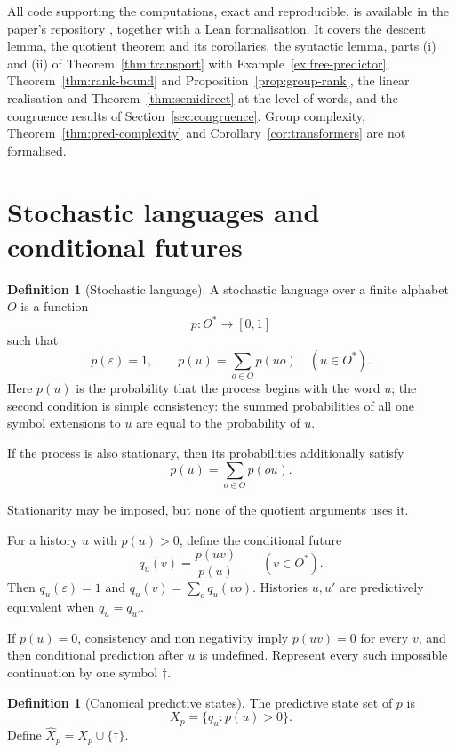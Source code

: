 \documentclass[10pt]{article}
\theoremstyle{definition}
\newtheorem{definition}[theorem]{Definition}
\theoremstyle{remark}
\newcommand{\Obs}{O}
\newcommand{\eps}{\varepsilon}
\begin{document}
All code supporting the computations, exact and reproducible, is
available in the paper's repository \cite{DovetailRepo}, together
with a Lean formalisation.  It covers the descent lemma, the quotient
theorem and its corollaries, the syntactic lemma, parts (i) and (ii)
of Theorem~\ref{thm:transport} with
Example~\ref{ex:free-predictor}, Theorem~\ref{thm:rank-bound} and
Proposition~\ref{prop:group-rank}, the linear realisation and
Theorem~\ref{thm:semidirect} at the level of words, and the
congruence results of Section~\ref{sec:congruence}.  Group
complexity, Theorem~\ref{thm:pred-complexity} and
Corollary~\ref{cor:transformers} are not formalised.

\section{Stochastic languages and conditional futures}
\label{sec:process}

\begin{definition}[Stochastic language]
A stochastic language over a finite alphabet $\Obs$ is a function
\[
  p:\Obs^*\longrightarrow[0,1]
\]
such that
\[
  p(\eps)=1,
  \qquad
  p(u)=\sum_{o\in\Obs}p(uo)
  \quad (u\in\Obs^*).
\]
Here $p(u)$ is the probability that the process begins with the word $u$; the second condition is simple consistency: the summed probabilities of all one symbol extensions to $u$ are
equal to the probability of $u$.
\end{definition}

If the process is also stationary,
then its probabilities additionally satisfy
\[
  p(u)=\sum_{o\in\Obs}p(ou).
\]

Stationarity may be imposed, but none of the quotient arguments uses it.

For a history $u$ with $p(u)>0$, define the conditional future
\[
  q_u(v)=\frac{p(uv)}{p(u)}
  \qquad(v\in\Obs^*).
\]
Then $q_u(\eps)=1$ and $q_u(v)=\sum_o q_u(vo)$.  Histories $u,u'$ are
predictively equivalent when $q_u=q_{u'}$.

If $p(u)=0$, consistency and non negativity imply $p(uv)=0$ for every
$v$, and then conditional prediction after $u$ is undefined.  Represent
every such impossible continuation by one symbol
$\dagger$.

\begin{definition}[Canonical predictive states]
The predictive state set of $p$ is
\[
  X_p=\{q_u:p(u)>0\}.
\]
Define $\widehat X_p=X_p\cup\{\dagger\}$.
\end{definition}
\end{document}
